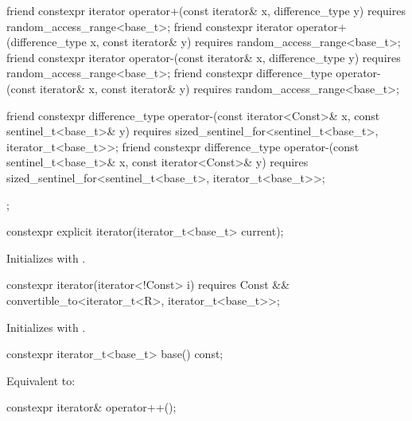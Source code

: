 \begin{codeblock}
{{    friend constexpr iterator operator+(const iterator& x, difference_type y)
      requires random_access_range<base_t>;
    friend constexpr iterator operator+(difference_type x, const iterator& y)
      requires random_access_range<base_t>;
    friend constexpr iterator operator-(const iterator& x, difference_type y)
      requires random_access_range<base_t>;
    friend constexpr difference_type operator-(const iterator& x, const iterator& y)
      requires random_access_range<base_t>;

    friend constexpr difference_type
      operator-(const iterator<Const>& x, const sentinel_t<base_t>& y)
        requires sized_sentinel_for<sentinel_t<base_t>, iterator_t<base_t>>;
    friend constexpr difference_type
      operator-(const sentinel_t<base_t>& x, const iterator<Const>& y)
        requires sized_sentinel_for<sentinel_t<base_t>, iterator_t<base_t>>;
  };
}
\end{codeblock}

%
\begin{itemdecl}
constexpr explicit iterator(iterator_t<base_t> current);
\end{itemdecl}

\begin{itemdescr}
\pnum
\effects
Initializes  with .
\end{itemdescr}

%
\begin{itemdecl}
constexpr iterator(iterator<!Const> i)
  requires Const && convertible_to<iterator_t<R>, iterator_t<base_t>>;
\end{itemdecl}

\begin{itemdescr}
\pnum
\effects
Initializes  with .
\end{itemdescr}

%
\begin{itemdecl}
constexpr iterator_t<base_t> base() const;
\end{itemdecl}

\begin{itemdescr}
\pnum
\effects
Equivalent to: 
\end{itemdescr}

%
\begin{itemdecl}
constexpr iterator& operator++();
\end{itemdecl}

